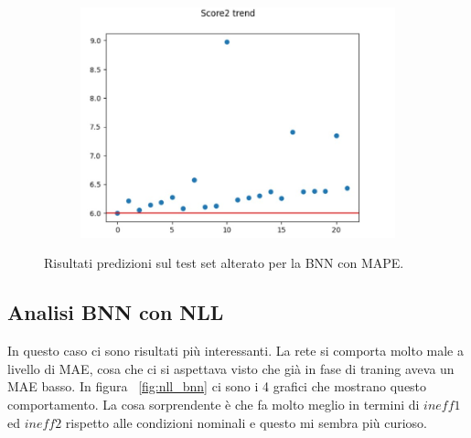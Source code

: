 \documentclass[
	letterpaper,
	a4paper,
	cleardoublepage=empty,
	headings=twolinechapter,
	numbers=autoenddot,
]{article}
\begin{document}
\begin{figure}[h]
\begin{subfigure}{.5\textwidth}
			\caption{}
			\label{fig:mape_bnn_ci}
		\end{subfigure}%
		\begin{subfigure}{.5\textwidth}
			\centering
			\includegraphics[width=0.7\linewidth]{ImageFiles/mape_bnn_eff2}
			\caption{}
			\label{fig:mae_bnn_eff2}
		\end{subfigure}
		\caption{Risultati predizioni sul test set alterato per la BNN con MAPE.}
		\label{fig:mape_bnn}
	\end{figure}
	
	\subsection{Analisi BNN con NLL}
	In questo caso ci sono risultati più interessanti. La rete si comporta molto male a livello di MAE, cosa che ci si aspettava visto che già in fase di traning aveva un MAE basso. In figura ~\ref{fig:nll_bnn} ci sono i 4 grafici che mostrano questo comportamento. La cosa sorprendente è che fa molto meglio in termini di $ineff1$ ed $ineff2$ rispetto alle condizioni nominali e questo mi sembra più curioso.
	
\end{document}
